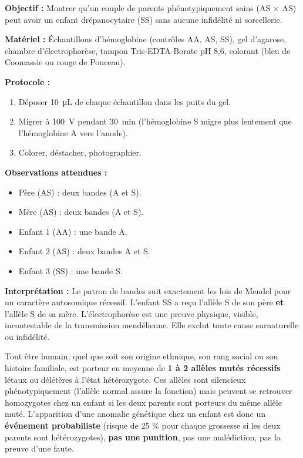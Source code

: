 \documentclass[11pt]{article}
\begin{document}
\begin{experience}
\textbf{Objectif :} Montrer qu'un couple de parents phénotypiquement sains (AS $\times$ AS) peut avoir un enfant drépanocytaire (SS) sans aucune infidélité ni sorcellerie.

\textbf{Matériel :} Échantillons d'hémoglobine (contrôles AA, AS, SS), gel d'agarose, chambre d'électrophorèse, tampon Tris-EDTA-Borate pH 8,6, colorant (bleu de Coomassie ou rouge de Ponceau).

\textbf{Protocole :}
\begin{enumerate}
    \item Déposer \SI{10}{\micro\liter} de chaque échantillon dans les puits du gel.
    \item Migrer à \SI{100}{\volt} pendant \SI{30}{\minute} (l'hémoglobine S migre plus lentement que l'hémoglobine A vers l'anode).
    \item Colorer, déstacher, photographier.
\end{enumerate}

\textbf{Observations attendues :}
\begin{itemize}
    \item Père (AS) : deux bandes (A et S).
    \item Mère (AS) : deux bandes (A et S).
    \item Enfant 1 (AA) : une bande A.
    \item Enfant 2 (AS) : deux bandes A et S.
    \item Enfant 3 (SS) : une bande S.
\end{itemize}

\textbf{Interprétation :} Le patron de bandes suit exactement les lois de Mendel pour un caractère autosomique récessif. L'enfant SS a reçu l'allèle S de son père \textbf{et} l'allèle S de sa mère. L'électrophorèse est une preuve physique, visible, incontestable de la transmission mendélienne. Elle exclut toute cause surnaturelle ou infidélité.
\end{experience}

\begin{propriete}
Tout être humain, quel que soit son origine ethnique, son rang social ou son histoire familiale, est porteur en moyenne de \textbf{1 à 2 allèles mutés récessifs} létaux ou délétères à l'état hétérozygote. Ces allèles sont silencieux phénotypiquement (l'allèle normal assure la fonction) mais peuvent se retrouver homozygotes chez un enfant si les deux parents sont porteurs du même allèle muté. L'apparition d'une anomalie génétique chez un enfant est donc un \textbf{événement probabiliste} (risque de 25 \% pour chaque grossesse si les deux parents sont hétérozygotes), \textbf{pas une punition}, pas une malédiction, pas la preuve d'une faute.
\end{propriete}
\end{document}
